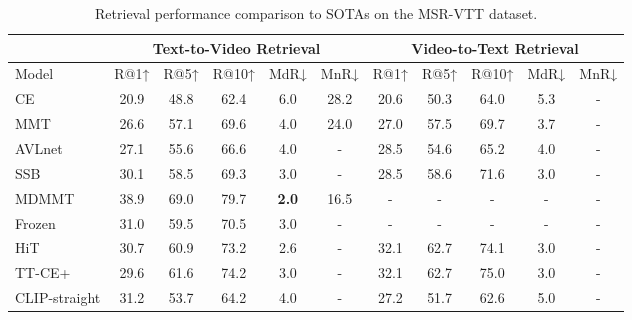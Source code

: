 \documentclass[sigconf]{acmart}
\begin{document}
\begin{table*}[]
\caption{Retrieval performance comparison to SOTAs on the MSR-VTT dataset.}
\vspace{-0.3cm}
\begin{tabular}{l|ccccc|ccccc}
\hline
           & \multicolumn{5}{c|}{Text-to-Video Retrieval}                                  & \multicolumn{5}{c}{Video-to-Text Retrieval}                                  \\
           \hline
Model      & R@1↑          & R@5↑          & R@10↑         & MdR↓         & MnR↓          & R@1↑          & R@5↑          & R@10↑
& MdR↓         & MnR↓          \\ \hline
CE \cite{liu2019use}        & 20.9          & 48.8          & 62.4          & 6.0          & 28.2          & 20.6          & 50.3          & 64.0          & 5.3          & -             \\
MMT  \cite{gabeur2020multi}      & 26.6          & 57.1          & 69.6          & 4.0          & 24.0          & 27.0          & 57.5          & 69.7          & 3.7          & -             \\
AVLnet \cite{rouditchenko2020avlnet}    & 27.1          & 55.6          & 66.6          & 4.0          & -             & 28.5          & 54.6          & 65.2          & 4.0          & -             \\
SSB \cite{patrick2020support}       & 30.1          & 58.5          & 69.3          & 3.0          & -             & 28.5          & 58.6          & 71.6          & 3.0          & -             \\
MDMMT \cite{dzabraev2021mdmmt}     & 38.9          & 69.0          & 79.7          & \textbf{2.0}          & 16.5          & -             & -             & -             & -            & -             \\
Frozen \cite{bain2021frozen}    & 31.0          & 59.5          & 70.5          & 3.0          & -             & -             & -             & -             & -            & -             \\
HiT  \cite{liu2021hit}      & 30.7          & 60.9          & 73.2          & 2.6          & -             & 32.1          & 62.7          & 74.1          & 3.0          & -             \\
TT-CE+  \cite{croitoru2021teachtext}   & 29.6          & 61.6          & 74.2          & 3.0          & -             & 32.1          & 62.7          & 75.0          & 3.0          & -             \\
CLIP-straight  \cite{portillo2021straightforward}     & 31.2          & 53.7          & 64.2          & 4.0          & -             & 27.2          & 51.7          & 62.6          & 5.0          & -             \\

\end{tabular}
\end{table*}
\end{document}
